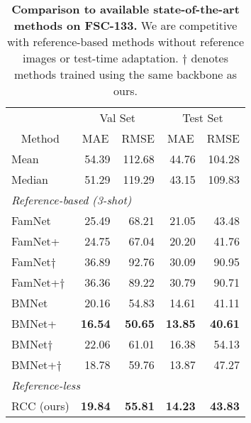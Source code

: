 \documentclass[letterpaper, 11pt]{IEEEtran}
\begin{document}
\begin{table}
    \centering
    \fontsize{9}{9}\selectfont
    \begin{tabular}{lrrrr}
 \toprule

 & \multicolumn{2}{c}{Val Set} & \multicolumn{2}{c}{Test Set} \\
\multicolumn{1}{c}{Method} & \multicolumn{1}{c}{MAE} & \multicolumn{1}{c}{RMSE} & \multicolumn{1}{c}{MAE} & \multicolumn{1}{c}{RMSE} \\
\midrule
Mean & 54.39 & 112.68 & 44.76 & 104.28 \\
Median & 51.29 & 119.29 & 43.15 & 109.83 \\
    \midrule

\multicolumn{3}{l}{\textit{Reference-based (3-shot)}} \\
FamNet 
 \cite{ranjan2021Famnet}
& 25.49 & 68.21 & 21.05 & 43.48 \\
FamNet+ 
 \cite{ranjan2021Famnet}
& 24.75 & 67.04
 &  20.20 & 41.76  \\ 
FamNet$\dag$ 
 \cite{ranjan2021Famnet}  &  
 36.89 & 92.76 & 30.09 & 90.95 \\ 
FamNet+$\dag$ 
 \cite{ranjan2021Famnet}
 & 36.36 & 89.22 &  30.79 & 90.71\\ 
BMNet 
 \cite{shi2022represent} & 20.16 & 54.83  & 14.61  & 41.11 \\
BMNet+ 
 \cite{shi2022represent}
&\textbf{16.54} &  \textbf{50.65}  & \textbf{13.85}  & \textbf{40.61}  \\
BMNet$\dag$ 
 \cite{shi2022represent}
& 22.06 & 61.01 & 16.38 & 54.13\\ 
BMNet+$\dag$  
 \cite{shi2022represent}
& 18.78 & 59.76  & 13.87  & 47.27  \\
\midrule
\multicolumn{3}{l}{\textit{Reference-less}} \\
RCC (ours) & \textbf{19.84}  & \textbf{55.81} & \textbf{14.23}  & \textbf{43.83} \\
\bottomrule
\end{tabular}
     \caption{\textbf{Comparison to available state-of-the-art methods on FSC-133.}  We are competitive with reference-based methods without  reference images or test-time adaptation.
    $\dag$ denotes methods trained using the same backbone as ours.
    }
    \label{FSC133_results_table}
\end{table}
\end{document}
